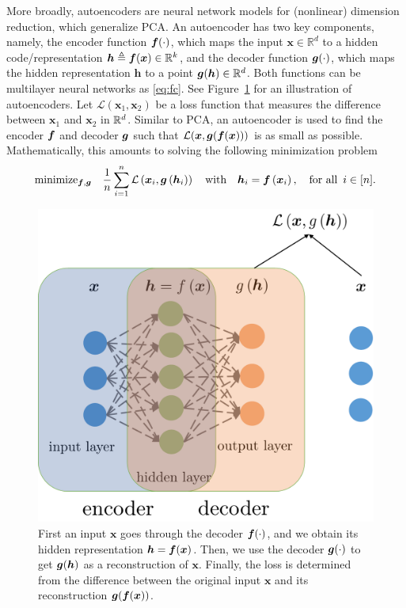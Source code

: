 More broadly, autoencoders are neural network models for (nonlinear) dimension reduction, which generalize PCA. An autoencoder has two key components, namely, the encoder function $\text{\boldmath $f$}(\cdot)$, which maps the input $\bm{x}\in\mathbb{R}^{d}$ to a hidden code/representation $\bm{h}\triangleq\text{\boldmath $f$}(\bm{x})\in\mathbb{R}^{k}$, and the decoder function $\text{\boldmath $g$}(\cdot)$, which maps the hidden representation $\bm{h}$ to a point $\text{\boldmath $g$}(\bm{h})\in\mathbb{R}^{d}$. Both functions can be multilayer neural networks as \eqref{eq:fc}. See Figure~\ref{fig:AE} for an illustration of autoencoders. Let $\mathcal{L}(\bm{x}_{1},\bm{x}_{2})$ be a loss function that measures the difference between $\bm{x}_{1}$ and $\bm{x}_{2}$ in $\mathbb{R}^d$. Similar to PCA, an autoencoder is used to find the encoder $\text{\boldmath $f$}$ and decoder $\text{\boldmath $g$}$ such that $\mathcal{L}(\bm{x},\text{\boldmath $g$}(\text{\boldmath $f$}(\bm{x})))$
is as small as possible. Mathematically, this amounts to solving the following minimization problem
\begin{equation}
\mbox{minimize}_{\text{\boldmath $f$},\text{\boldmath $g$}} \quad\frac{1}{n}\sum_{i=1}^{n}\mathcal{L}\left(\bm{x}_{i},\text{\boldmath $g$}\left(\bm{h}_{i}\right)\right) \quad \text{with}\quad\bm{h}_{i}=\text{\boldmath $f$}\left(\bm{x}_{i}\right), \quad \text{for all }\, i \in [n].  \label{eq:AE}
\end{equation}
\begin{figure}
\centering\includegraphics[scale=0.3]{AE}
\caption{First an input $\bm{x}$ goes through the decoder $\text{\boldmath $f$}(\cdot)$, and we obtain its hidden representation $\bm{h}= \text{\boldmath $f$}(\bm{x})$. Then, we use the decoder $\text{\boldmath $g$}(\cdot)$ to get $\text{\boldmath $g$}(\bm{h})$ as a reconstruction of $\bm{x}$. Finally, the loss is determined from the difference between the original input $\bm{x}$ and its reconstruction $\text{\boldmath $g$}(\text{\boldmath $f$}(\bm{x}))$.}\label{fig:AE} %
\end{figure}

